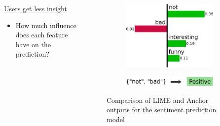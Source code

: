 \documentclass[aspectratio=169]{slide-en}
\begin{document}
\begin{frame}{}
  \begin{columns}[]
    \begin{column}{0.45\textwidth}
      \underline{Users get less insight}

      \bigskip
      \begin{itemize}
        \item How much influence does each feature have on the prediction?
      \end{itemize}
    \end{column}
    \begin{column}{0.5\textwidth}
      \begin{figure}
        \begin{subfigure}[t]{\textwidth}
          \centering
          \includegraphics[scale=0.4]{example-lime}
        \end{subfigure}
        \begin{subfigure}[t]{\textwidth}
          \centering
          \vspace{0.5em}
          \includegraphics[scale=0.4]{example-anchor}
        \end{subfigure}
        \vspace{0.5em}
        \caption{Comparison of LIME and Anchor outputs for the sentiment prediction model}
      \end{figure}
    \end{column}
  \end{columns}
\end{frame}
\end{document}
